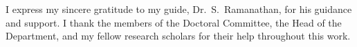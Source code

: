 I express my sincere gratitude to my guide, Dr.\ S.\ Ramanathan, for his guidance and support. I
thank the members of the Doctoral Committee, the Head of the Department, and my fellow research
scholars for their help throughout this work.
